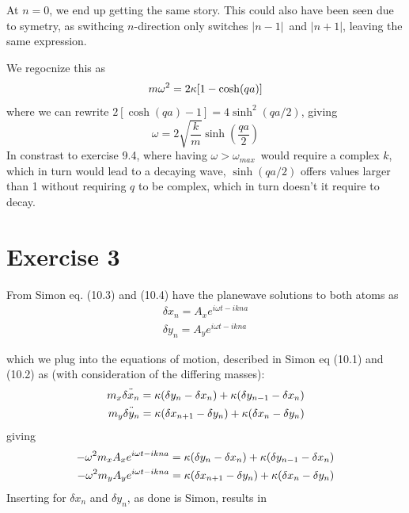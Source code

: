 \documentclass[12p,a4paper]{article}
\renewcommand{\exp}{e^}
\renewcommand{\exp}{e^}
\begin{document}
At $n=0$, we end up getting the same story. This could also have been seen due to symetry, as swithcing $n$-direction only switches $|n-1|$ and $|n+1|$, leaving the same expression.

We regocnize this as
\[
    m\omega^2 =2\kappa\qty[1 - \cosh(qa)]
\]
where we can rewrite $2[\cosh(qa) - 1] = 4\sinh^2(qa/2)$, giving
\[
    \omega = 2\sqrt{\frac{k}{m}}\sinh(\frac{qa}{2})
\]
In constrast to exercise 9.4, where having $\omega > \omega_{max}$ would require a complex $k$, which in turn would lead to a decaying wave, $\sinh(qa/2)$ offers values larger than 1 without requiring $q$ to be complex, which in turn doesn't it require to decay.







\section*{Exercise 3}
From Simon eq. (10.3) and (10.4) have the planewave solutions to both atoms as
\begin{align*}
    \delta x_n = A_x\exp{i\omega t - ikna} \\
    \delta y_n = A_y\exp{i\omega t - ikna}
\end{align*}

which we plug into the equations of motion, described in Simon eq (10.1) and (10.2) as (with consideration of the differing masses):
\begin{align*}
    m_x \ddot{\delta x_n} = \kappa\qty(\delta y_n - \delta x_n) + \kappa(\delta y_{n-1} - \delta x_n) \\
    m_y \ddot{\delta y_n} = \kappa\qty(\delta x_{n+1} - \delta y_n) + \kappa(\delta x_n - \delta y_n)
\end{align*}
giving
\begin{align*}
    -\omega^2 m_x A_x\exp{i\omega t - ikna} = \kappa\qty(\delta y_n - \delta x_n) + \kappa(\delta y_{n-1} - \delta x_n) \\
    -\omega^2 m_y A_y\exp{i\omega t - ikna} = \kappa\qty(\delta x_{n+1} - \delta y_n) + \kappa(\delta x_n - \delta y_n)
\end{align*}
Inserting for $\delta x_n$ and $\delta y_n$, as done is Simon, results in 
\end{document}
